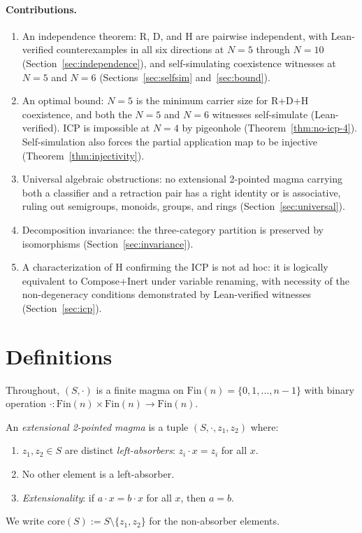 \documentclass[sigconf,screen,review,anonymous]{acmart}
\newcommand{\dotop}{\cdot}
\newcommand{\Fin}{\mathrm{Fin}}
\newcommand{\core}{\mathrm{core}}
\theoremstyle{remark}
\begin{document}
\paragraph{Contributions.}
\begin{enumerate}
  \item An independence theorem: R, D, and H are pairwise independent, with Lean-verified counterexamples in all six directions at $N\!=\!5$ through $N\!=\!10$ (Section~\ref{sec:independence}), and self-simulating coexistence witnesses at $N\!=\!5$ and $N\!=\!6$ (Sections~\ref{sec:selfsim} and~\ref{sec:bound}).
  \item An optimal bound: $N\!=\!5$ is the minimum carrier size for R+D+H coexistence, and both the $N\!=\!5$ and $N\!=\!6$ witnesses self-simulate (Lean-verified). ICP is impossible at $N\!=\!4$ by pigeonhole (Theorem~\ref{thm:no-icp-4}). Self-simulation also forces the partial application map to be injective (Theorem~\ref{thm:injectivity}).
  \item Universal algebraic obstructions: no extensional 2-pointed magma carrying both a classifier and a retraction pair has a right identity or is associative, ruling out semigroups, monoids, groups, and rings (Section~\ref{sec:universal}).
  \item Decomposition invariance: the three-category partition is preserved by isomorphisms (Section~\ref{sec:invariance}).
  \item A characterization of H confirming the ICP is not ad hoc: it is logically equivalent to Compose+Inert under variable renaming, with necessity of the non-degeneracy conditions demonstrated by Lean-verified witnesses (Section~\ref{sec:icp}).
\end{enumerate}

\section{Definitions}
\label{sec:definitions}

Throughout, $(S, \dotop)$ is a finite magma on $\Fin(n) = \{0, 1, \ldots, n-1\}$ with binary operation $\dotop : \Fin(n) \times \Fin(n) \to \Fin(n)$.

\begin{definition}
\label{def:epm}
An \emph{extensional 2-pointed magma} is a tuple $(S, \dotop, z_1, z_2)$ where:
\begin{enumerate}
  \item $z_1, z_2 \in S$ are distinct \emph{left-absorbers}: $z_i \dotop x = z_i$ for all $x$.
  \item No other element is a left-absorber.
  \item \emph{Extensionality}: if $a \dotop x = b \dotop x$ for all $x$, then $a = b$.
\end{enumerate}
We write $\core(S) := S \setminus \{z_1, z_2\}$ for the non-absorber elements.
\end{definition}
\end{document}
